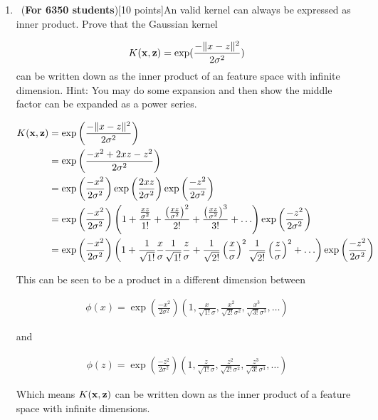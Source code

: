 \begin{enumerate}
 \item ~(\textbf{For 6350 students})[10 points]An valid kernel can always be  expressed as inner product. Prove that the Gaussian  kernel

$$K({\bf x}, {\bf z}) = \exp(\frac{-\| x -z\|^2}{2 \sigma^2})$$
 can be written down as the inner product of an feature space with infinite dimension. Hint:  You may do some expansion and  then show the middle factor can be expanded as a power series.
 
   \begin{equation*}
\begin{aligned}
  K({\bf x}, {\bf z}) &= \exp\left(\frac{-\| x -z\|^2}{2 \sigma^2}\right)\\
  &= \exp\left(\frac{-x^2 + 2xz -z^2}{2\sigma^2}\right)\\
  &= \exp\left(\frac{-x^2}{2\sigma^2}\right) \exp\left(\frac{2xz}{2\sigma^2}\right) \exp\left(\frac{-z^2}{2\sigma^2}\right)\\
  &= \exp\left(\frac{-x^2}{2\sigma^2}\right) \left(1+ \frac{\frac{xz}{\sigma^2}}{1!}  + \frac{\left(\frac{xz}{\sigma^2}\right)^2}{2!} + \frac{\left(\frac{xz}{\sigma^2}\right)^3}{3!}+ \ldots \right) \exp\left(\frac{-z^2}{2\sigma^2}\right)\\
  &= \exp\left(\frac{-x^2}{2\sigma^2}\right) \left(1+ \frac{1}{\sqrt{1!}}\frac{x}{\sigma } \frac{1}{\sqrt{1!}}\frac{z}{\sigma } +  \frac{1}{\sqrt{2!}}\left(\frac{x}{\sigma }\right)^2 \frac{1}{\sqrt{2!}}\left(\frac{z}{\sigma } \right)^2+  \ldots \right) \exp\left(\frac{-z^2}{2\sigma^2}\right)\\
\end{aligned}
\end{equation*}

This can be seen to be a product in a different dimension between

   \begin{equation*}
\begin{aligned}
\phi(x) = \exp(\frac{-x^2}{2\sigma^2}) \left(1, \frac{x}{\sqrt{1!}\sigma}, \frac{x^2}{\sqrt{2!}\sigma^2} , \frac{x^3}{\sqrt{3!}\sigma^3} , \ldots\right)
\end{aligned}
\end{equation*}
 
 and 
 
   \begin{equation*}
\begin{aligned}
\phi(z) = \exp(\frac{-z^2}{2\sigma^2}) \left(1, \frac{z}{\sqrt{1!}\sigma}, \frac{z^2}{\sqrt{2!}\sigma^2} , \frac{z^3}{\sqrt{3!}\sigma^3} , \ldots\right)
\end{aligned}
\end{equation*}
 
 Which means $K({\bf x}, {\bf z})$ can be written down as the inner product of a feature space with infinite dimensions. 
\end{enumerate}


